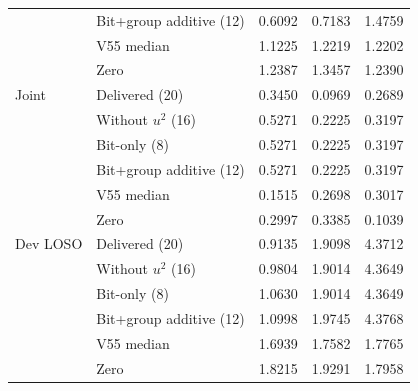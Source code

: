 \begin{table}[H]
\begin{tabular}{@{}llrrr@{}}
 & Bit+group additive (12) & 0.6092 & 0.7183 & 1.4759 \\
 & V55 median & 1.1225 & 1.2219 & 1.2202 \\
 & Zero & 1.2387 & 1.3457 & 1.2390 \\
\addlinespace
Joint & Delivered (20) & 0.3450 & 0.0969 & 0.2689 \\
 & Without $u^2$ (16) & 0.5271 & 0.2225 & 0.3197 \\
 & Bit-only (8) & 0.5271 & 0.2225 & 0.3197 \\
 & Bit+group additive (12) & 0.5271 & 0.2225 & 0.3197 \\
 & V55 median & 0.1515 & 0.2698 & 0.3017 \\
 & Zero & 0.2997 & 0.3385 & 0.1039 \\
\addlinespace
Dev LOSO & Delivered (20) & 0.9135 & 1.9098 & 4.3712 \\
 & Without $u^2$ (16) & 0.9804 & 1.9014 & 4.3649 \\
 & Bit-only (8) & 1.0630 & 1.9014 & 4.3649 \\
 & Bit+group additive (12) & 1.0998 & 1.9745 & 4.3768 \\
 & V55 median & 1.6939 & 1.7582 & 1.7765 \\
 & Zero & 1.8215 & 1.9291 & 1.7958 \\
\bottomrule
\end{tabular}
\end{table}
